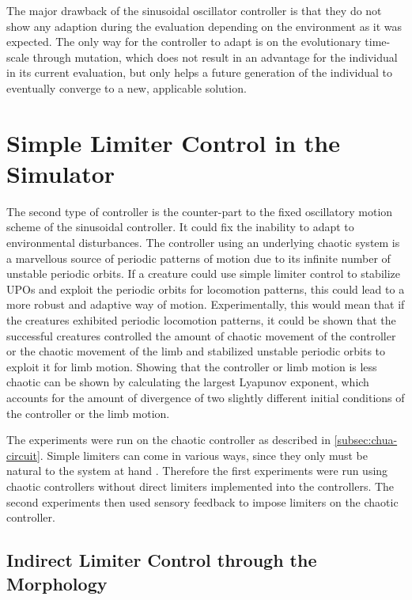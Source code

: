 \documentclass[main]{subfiles}
\begin{document}
The major drawback of the sinusoidal oscillator controller is that they do not show any adaption during the evaluation depending on the environment as it was expected. %
%
The only way for the controller to adapt is on the evolutionary time-scale through mutation, which does not result in an advantage for the individual in its current evaluation, but only helps a future generation of the individual to eventually converge to a new, applicable solution. 

\section{Simple Limiter Control in the Simulator}

The second type of controller is the counter-part to the fixed oscillatory motion scheme of the sinusoidal controller. %
%
It could fix the inability to adapt to environmental disturbances. %
%
The controller using an underlying chaotic system is a marvellous source of periodic patterns of motion due to its infinite number of unstable periodic orbits. %
%
If a creature could use simple limiter control to stabilize UPOs and exploit the periodic orbits for locomotion patterns, this could lead to a more robust and adaptive way of motion. %
%
Experimentally, this would mean that if the creatures exhibited periodic locomotion patterns, it could be shown that the successful creatures controlled the amount of chaotic movement of the controller or the chaotic movement of the limb and stabilized unstable periodic orbits to exploit it for limb motion. %
%
Showing that the controller or limb motion is less chaotic can be shown by calculating the largest Lyapunov exponent, which accounts for the amount of divergence of two slightly different initial conditions of the controller or the limb motion.

The experiments were run on the chaotic controller as described in \ref{subsec:chua-circuit}. %
%
Simple limiters can come in various ways, since they only must be natural to the system at hand \cite{bib:Corron2000}. %
%
Therefore the first experiments were run using chaotic controllers without direct limiters implemented into the controllers. %
%
The second experiments then used sensory feedback to impose limiters on the chaotic controller. 

\subsection{Indirect Limiter Control through the Morphology}
\end{document}
